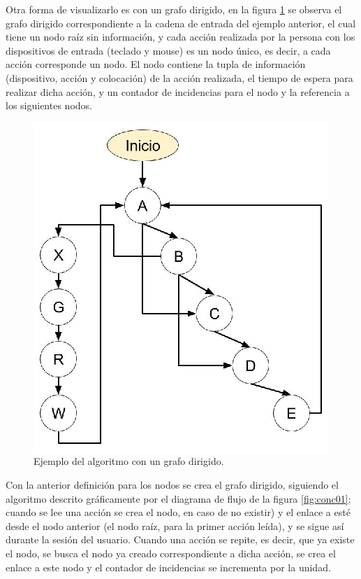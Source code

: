 
Otra forma de visualizarlo es con un grafo dirigido, en la figura
 \ref{fig:alg02} se observa el grafo dirigido correspondiente a la cadena
 de entrada del ejemplo anterior, el cual tiene un nodo ra\'iz sin 
 informaci\'on, y cada acci\'on realizada por la persona con los dispositivos
 de entrada (teclado y mouse) es un nodo \'unico, es decir, a cada acci\'on 
 corresponde un nodo. El nodo contiene la tupla de informaci\'on (dispositivo,
 acci\'on y colocaci\'on) de la acci\'on realizada, el tiempo de espera para
 realizar dicha acci\'on, y un contador de incidencias para el nodo y la
 referencia a los siguientes nodos.
 
\begin{figure}[h!]
\centering
\includegraphics[width=0.5\columnwidth]{chap4/Imagenes/algoritmo2.eps}
\caption{Ejemplo del algoritmo con un grafo dirigido.}
\label{fig:alg02}
\end{figure} 
 
\newpage
Con la anterior definici\'on para los nodos se crea el grafo dirigido,
 siguiendo el algoritmo descrito gr\'aficamente por el diagrama de flujo 
 de la figura \ref{fig:conc01}; cuando se lee una acci\'on se crea el nodo,
 en caso de no existir) y el enlace a est\'e desde el nodo anterior (el nodo
 ra\'iz, para la primer acci\'on le\'ida), y se sigue as\'i durante la sesi\'on
 del usuario. Cuando una acci\'on se repite, es decir, que ya existe el nodo,
 se busca el nodo ya creado correspondiente a dicha acci\'on, se crea el enlace 
 a este nodo y el contador de incidencias se incrementa por la unidad.

